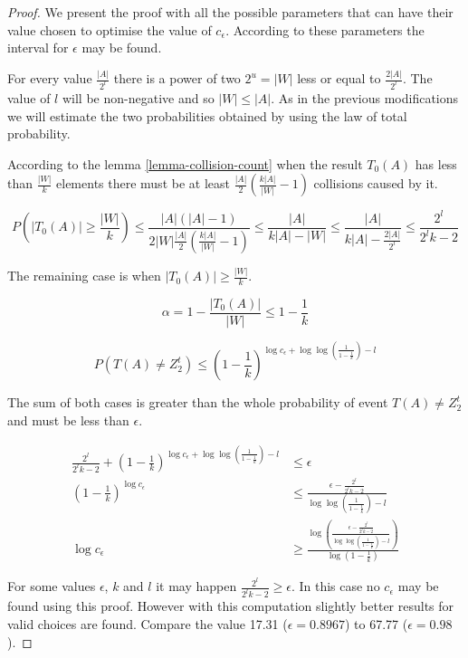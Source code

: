 \begin{proof}
We present the proof with all the possible parameters that can have their value chosen to optimise the value of $c_\epsilon$. According to these parameters the interval for $\epsilon$ may be found.

For every value $\frac{|A|}{2^l}$ there is a power of two $2^u = |W|$ less or equal to $\frac{2|A|}{2^l}$. The value of $l$ will be non-negative and so $|W| \leq |A|$. As in the previous modifications we will estimate the two probabilities obtained by using the law of total probability.

According to the lemma \ref{lemma-collision-count} when the result $T_0(A)$ has less than $\frac{|W|}{k}$ elements there must be at least $\frac{|A|}{2}\left(\frac{k|A|}{|W|} - 1\right)$ collisions caused by it.

\begin{displaymath}
P(|T_0(A)| \geq \frac{|W|}{k}) \leq \frac{|A|(|A| - 1)}{2|W|\frac{|A|}{2}\left(\frac{k|A|}{|W|} - 1\right)} \leq \frac{|A|}{k|A| - |W|} \leq \frac{|A|}{k|A| - \frac{2|A|}{2^l}} \leq \frac{2^l}{2^l k - 2}
\end{displaymath}

The remaining case is when $|T_0(A)| \geq \frac {|W|}{k}$.

\begin{displaymath}
\alpha = 1 - \frac{|T_0(A)|}{|W|} \leq 1 - \frac{1}{k}
\end{displaymath}

\begin{displaymath}
P(T(A) \neq Z_2^t) \leq \left(1 - \frac{1}{k}\right)^{\log c_\epsilon + \log \log \left( \frac{1}{1 - \frac{1}{k}} \right) - l}
\end{displaymath}

The sum of both cases is greater than the whole probability of event $T(A) \neq Z_2^t$ and must be less than $\epsilon$.

\begin{displaymath}
\begin{split}
\frac{2^l}{2^l k - 2} + \left(1 - \frac{1}{k}\right)^{\log c_\epsilon + \log \log \left( \frac{1}{1 - \frac{1}{k}} \right) - l} & \leq \epsilon \\
\left(1 - \frac{1}{k}\right)^{\log c_\epsilon} & \leq \frac{\epsilon - \frac{2^l}{2^l k - 2}}{\log \log \left( \frac{1}{1 - \frac{1}{k}} \right) - l} \\
\log c_\epsilon & \geq \frac{\log \left(\frac{\epsilon - \frac{2^l}{2^l k - 2}}{\log \log \left( \frac{1}{1 - \frac{1}{k}} \right) - l}\right)}{\log \left(1 - \frac{1}{k}\right)}
\end{split}
\end{displaymath}

For some values $\epsilon$, $k$ and $l$ it may happen $\frac{2^l}{2^l k - 2} \geq \epsilon$. In this case no $c_\epsilon$ may be found using this proof. However with this computation slightly better results for valid choices are found. Compare the value 17.31 ($\epsilon = 0.8967$) to 67.77 ($\epsilon = 0.98$).
\end{proof}

